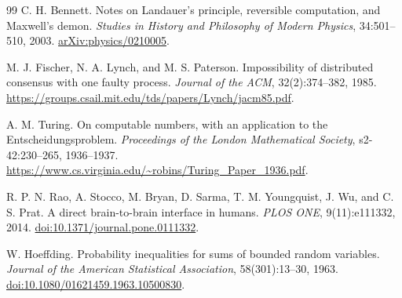 \documentclass[11pt,a4paper]{article}
\theoremstyle{definition}
\theoremstyle{remark}
\begin{document}
\begin{thebibliography}{99}
C. H. Bennett. Notes on Landauer's principle, reversible computation, and Maxwell's demon. \emph{Studies in History and Philosophy of Modern Physics}, 34:501--510, 2003. \href{https://arxiv.org/abs/physics/0210005}{arXiv:physics/0210005}.

M. J. Fischer, N. A. Lynch, and M. S. Paterson. Impossibility of distributed consensus with one faulty process. \emph{Journal of the ACM}, 32(2):374--382, 1985. \url{https://groups.csail.mit.edu/tds/papers/Lynch/jacm85.pdf}.

A. M. Turing. On computable numbers, with an application to the Entscheidungsproblem. \emph{Proceedings of the London Mathematical Society}, s2-42:230--265, 1936--1937. \url{https://www.cs.virginia.edu/~robins/Turing_Paper_1936.pdf}.

R. P. N. Rao, A. Stocco, M. Bryan, D. Sarma, T. M. Youngquist, J. Wu, and C. S. Prat. A direct brain-to-brain interface in humans. \emph{PLOS ONE}, 9(11):e111332, 2014. \href{https://doi.org/10.1371/journal.pone.0111332}{doi:10.1371/journal.pone.0111332}.

W. Hoeffding. Probability inequalities for sums of bounded random variables. \emph{Journal of the American Statistical Association}, 58(301):13--30, 1963. \href{https://doi.org/10.1080/01621459.1963.10500830}{doi:10.1080/01621459.1963.10500830}.
\end{thebibliography}
\end{document}
